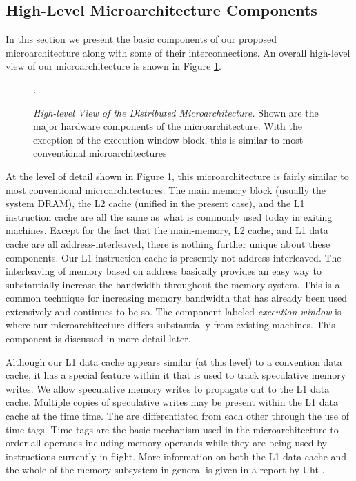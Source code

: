 \documentclass[10pt,dvips]{article}
\begin{document}
\subsection{High-Level Microarchitecture Components}
%
In this section we present the basic components of our proposed
microarchitecture along with some of their interconnections.
An overall high-level view of our microarchitecture is shown in 
Figure \ref{fig:high}.
%
\begin{figure}
\centering
{}
\caption{{\em High-level View of the Distributed Microarchitecture.} 
Shown are the major hardware components of the microarchitecture.
With the exception of the 
execution window block, this is similar to most conventional
microarchitectures}.
\label{fig:high}
\end{figure}
%
At the level of detail shown in Figure \ref{fig:high}, this
microarchitecture is fairly similar to most conventional
microarchitectures.
The main memory block (usually the system DRAM),
the L2 cache (unified in the present case), and the L1 instruction 
cache are all the same as what is commonly used today in exiting
machines.
Except for the fact that the main-memory, L2 cache, and L1 data
cache are all address-interleaved, there is nothing further
unique about these components.  Our L1 instruction
cache is presently not address-interleaved.
The interleaving of memory based on address basically provides an easy way
to substantially increase the bandwidth throughout the
memory system.  This is a common technique for increasing
memory bandwidth that has already been used extensively
and continues to be so.
The component labeled \textit{execution window} is where
our microarchitecture differs substantially from existing machines.
This component is discussed in more detail later.

Although our L1 data cache appears similar (at this level) to 
a convention data cache, it has a special feature within it
that is used to track speculative memory writes.
We allow speculative memory writes to propagate
out to the L1 data cache.  Multiple copies
of speculative writes may be present within the L1 data cache
at the time time.  The are differentiated from each other
through the use of time-tags.  Time-tags are the basic mechanism
used in the microarchitecture to order all operands including
memory operands while they are being used by instructions
currently in-flight.
More information on both the L1 data cache and the whole of
the memory subsystem in general is given in a report
by Uht \cite{Uht02b}.
\end{document}

